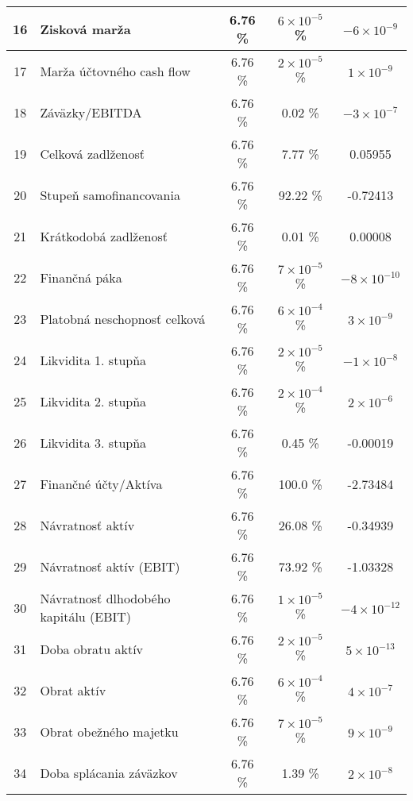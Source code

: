 \begin{longtable}{ |c|p{5cm}|c|c|c| }
        \hline
        16 & Zisková marža & 6.76 \% & \(6 \times 10^{-5}\) \% & \(-6 \times 10^{-9}\) \\
        \hline
        17 & Marža účtovného cash flow & 6.76 \% & \(2 \times 10^{-5}\) \% & \(1 \times 10^{-9}\) \\
        \hline
        18 & Záväzky/EBITDA & 6.76 \% & 0.02 \% & \(-3 \times 10^{-7}\) \\
        \hline
        19 & Celková zadlženosť & 6.76 \% & 7.77 \% & 0.05955 \\
        \hline
        20 & Stupeň samofinancovania & 6.76 \% & 92.22 \% & -0.72413 \\
        \hline
        21 & Krátkodobá zadlženosť & 6.76 \% & 0.01 \% & 0.00008 \\
        \hline
        22 & Finančná páka & 6.76 \% & \(7 \times 10^{-5}\) \% & \(-8 \times 10^{-10}\) \\
        \hline
        23 & Platobná neschopnosť celková & 6.76 \% & \(6 \times 10^{-4}\) \% & \(3 \times 10^{-9}\) \\
        \hline
        24 & Likvidita 1. stupňa & 6.76 \% & \(2 \times 10^{-5}\) \% & \(-1 \times 10^{-8}\) \\
        \hline
        25 & Likvidita 2. stupňa & 6.76 \% & \(2 \times 10^{-4}\) \% & \(2 \times 10^{-6}\) \\
        \hline
        26 & Likvidita 3. stupňa & 6.76 \% & 0.45 \% & -0.00019 \\
        \hline
        27 & Finančné účty/Aktíva & 6.76 \% & 100.0 \% & -2.73484 \\
        \hline
        28 & Návratnosť aktív & 6.76 \% & 26.08 \% & -0.34939 \\
        \hline
        29 & Návratnosť aktív (EBIT) & 6.76 \% & 73.92 \% & -1.03328 \\
        \hline
        30 & Návratnosť dlhodobého kapitálu (EBIT) & 6.76 \% & \(1 \times 10^{-5}\) \% & \(-4 \times 10^{-12}\) \\
        \hline
        31 & Doba obratu aktív & 6.76 \% & \(2 \times 10^{-5}\) \% & \(5 \times 10^{-13}\) \\
        \hline
        32 & Obrat aktív & 6.76 \% & \(6 \times 10^{-4}\) \% & \(4 \times 10^{-7}\) \\
        \hline
        33 & Obrat obežného majetku & 6.76 \% & \(7 \times 10^{-5}\) \% & \(9 \times 10^{-9}\) \\
        \hline
        34 & Doba splácania záväzkov & 6.76 \% & 1.39 \% & \(2 \times 10^{-8}\) \\

\end{longtable}
